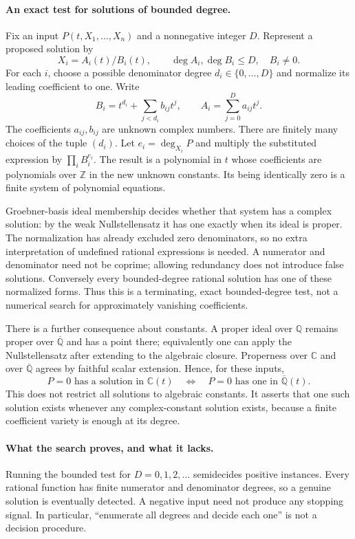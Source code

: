 \documentclass[11pt]{article}
\begin{document}
\paragraph{An exact test for solutions of bounded degree.}
Fix an input $P(t,X_1,\ldots,X_n)$ and a nonnegative integer $D$.
Represent a proposed solution by
\[
 X_i=A_i(t)/B_i(t),\qquad \deg A_i,\deg B_i\le D,
 \quad B_i\ne0.
\]
For each $i$, choose a possible denominator degree $d_i\in\{0,\ldots,D\}$
and normalize its leading coefficient to one. Write
\[
 B_i=t^{d_i}+\sum_{j<d_i}b_{ij}t^j,\qquad
 A_i=\sum_{j=0}^D a_{ij}t^j.
\]
The coefficients $a_{ij},b_{ij}$ are unknown complex numbers. There are
finitely many choices of the tuple $(d_i)$. Let $e_i=\deg_{X_i}P$ and
multiply the substituted expression by $\prod_i B_i^{e_i}$. The result
is a polynomial in $t$ whose coefficients are polynomials over
$\mathbb Z$ in the new unknown constants. Its being identically zero
is a finite system of polynomial equations.

Groebner-basis ideal membership decides whether that system has a
complex solution: by the weak Nullstellensatz it has one exactly when
its ideal is proper. The normalization has already excluded zero
denominators, so no extra interpretation of undefined rational
expressions is needed. A numerator and denominator need not be coprime;
allowing redundancy does not introduce false solutions. Conversely every
bounded-degree rational solution has one of these normalized forms.
Thus this is a terminating, exact bounded-degree test, not a numerical
search for approximately vanishing coefficients.

There is a further consequence about constants. A proper ideal over
$\mathbb Q$ remains proper over $\overline{\mathbb Q}$ and has a point
there; equivalently one can apply the Nullstellensatz after extending
to the algebraic closure. Properness over $\mathbb C$ and over
$\overline{\mathbb Q}$ agrees by faithful scalar extension. Hence, for
these inputs,
\[
 P=0\text{ has a solution in }\mathbb C(t)
 \quad\Longleftrightarrow\quad
 P=0\text{ has one in }\overline{\mathbb Q}(t).       \tag{1}
\]
This does not restrict all solutions to algebraic constants. It asserts
that one such solution exists whenever any complex-constant solution
exists, because a finite coefficient variety is enough at its degree.

\paragraph{What the search proves, and what it lacks.}
Running the bounded test for $D=0,1,2,\ldots$ semidecides positive
instances. Every rational function has finite numerator and denominator
degrees, so a genuine solution is eventually detected. A negative input
need not produce any stopping signal. In particular, ``enumerate all
degrees and decide each one'' is not a decision procedure.
\end{document}
